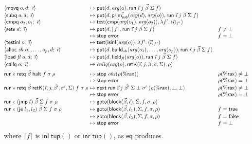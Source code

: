\documentclass[10pt]{article}
\theoremstyle{acmplain}
\newcommand{\key}[1]{\mathsf{#1}}
\newcommand{\res}[1]{\lceil #1 \rceil}
\newcommand{\nxt}{\key{next}\;}
\newcommand{\stp}{\key{stop}\;}
\newcommand{\error}{\key{error}}
\newcommand{\obs}{\mathit{obs}}
\newcommand{\tupV}[1]{\key{tup}(#1)}
\newcommand{\inlV}{\key{inl}\;}
\newcommand{\inrV}{\key{inr}\;}
\newcommand{\halt}{\key{halt}}
\newcommand{\rax}{\%\key{rax}}
\newcommand{\xrun}{\key{run}}
\begin{document}
\[
\begin{array}{@{}l@{\;\mapsto\;}l@{\quad}l@{}}
  \langle \key{movq}\; o, d;\; \vec{\imath} \rangle & \key{put}(d, \mathit{arg}(o), \xrun\;\vec{\imath}\;j\;\vec{\beta}\;\Sigma\;f) \\
  \langle \key{subq}\; o, d;\; \vec{\imath} \rangle &
    \key{put}(d, \key{prim}^?_{\key{sub}}(\mathit{arg}(d), \mathit{arg}(o)), \xrun\;\vec{\imath}\;j\;\vec{\beta}\;\Sigma\;f) \\
  \langle \key{cmpq}\; o_2, o_1;\; \vec{\imath} \rangle &
    \key{test}(\key{cmp}(\mathit{arg}(o_1), \mathit{arg}(o_2)), \lambda f'.\, \langle \vec{\imath} \rangle_{f'}) \\
  \langle \key{sete}\; d;\; \vec{\imath} \rangle & \key{put}(d, \res{f}, \xrun\;\vec{\imath}\;j\;\vec{\beta}\;\Sigma\;f) & f \neq \bot \\
  & \stp \error & f = \bot \\
  \langle \key{testinl}\; o;\; \vec{\imath} \rangle &
    \key{test}(\key{isinl}(\mathit{arg}(o)), \lambda f'.\, \langle \vec{\imath} \rangle_{f'}) \\
  \langle \key{alloc}\; \mathit{sh}\; o_1, \ldots, o_p, d;\; \vec{\imath} \rangle &
    \key{put}(d, \key{build}_{\mathit{sh}}(\mathit{arg}(o_1), \ldots, \mathit{arg}(o_p)), \xrun\;\vec{\imath}\;j\;\vec{\beta}\;\Sigma\;f) \\
  \langle \key{load}\; \mathit{fl}\; o, d;\; \vec{\imath} \rangle &
    \key{put}(d, \key{field}_{\mathit{fl}}(\mathit{arg}(o)), \xrun\;\vec{\imath}\;j\;\vec{\beta}\;\Sigma\;f) \\
  \langle \key{callq}\; o;\; \vec{\imath} \rangle &
    \mathit{callq}(\mathit{arg}(o), \key{retK}(\vec{\imath}, j, \vec{\beta}, \sigma, \Sigma), \rho) \\[1ex]
  \xrun\;\epsilon\;\key{retq}\;\vec{\beta}\;\halt\;f\;\sigma\;\rho & \stp \obs(\rho(\rax)) & \rho(\rax) \neq \bot \\
  & \stp \error & \rho(\rax) = \bot \\
  \xrun\;\epsilon\;\key{retq}\;\vec{\beta}\;\key{retK}(\vec{\imath}, j, \vec{\beta}', \sigma', \Sigma)\;f\;\sigma\;\rho &
    \nxt \xrun\;\vec{\imath}\;j\;\vec{\beta}'\;\Sigma\;\bot\;\sigma'\;(\rho(\rax), \bot, \bot) & \rho(\rax) \neq \bot \\
  & \stp \error & \rho(\rax) = \bot \\
  \xrun\;\epsilon\;(\key{jmp}\; l)\;\vec{\beta}\;\Sigma\;f\;\sigma\;\rho & \key{goto}(\key{block}(\vec{\beta}, l), \Sigma, f, \sigma, \rho) \\
  \xrun\;\epsilon\;(\key{je}\; l_1, l_2)\;\vec{\beta}\;\Sigma\;f\;\sigma\;\rho & \key{goto}(\key{block}(\vec{\beta}, l_1), \Sigma, f, \sigma, \rho) & f = \mathsf{true} \\
  & \key{goto}(\key{block}(\vec{\beta}, l_2), \Sigma, f, \sigma, \rho) & f = \mathsf{false} \\
  & \stp \error & f = \bot
\end{array}
\]
where $\res{f}$ is $\inlV \tupV{}$ or $\inrV \tupV{}$, as $\key{eq}$ produces.
\end{document}
